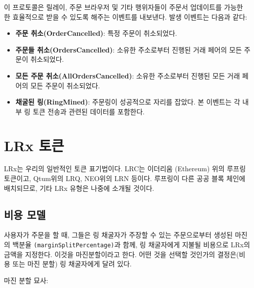 \documentclass{article}
\makeatletter
\newenvironment{figurehere}
{\def\@captype{figure}}
{}
\makeatother
\begin{document}
\begin{multicols}{2}
이 프로토콜은 릴레이, 주문 브라우저 및 기타 행위자들이 주문서 업데이트를 가능한 한 효율적으로 받을 수 있도록 해주는 이벤트를 내보낸다. 발생 이벤트는 다음과 같다:

\begin{itemize}
	\item \textbf{주문 취소(OrderCancelled)}: 특정 주문이 취소되었다.
	\item \textbf{주문들 취소(OrdersCancelled)}: 소유한 주소로부터 진행된 거래 페어의 모든 주문이 취소되었다.
	\item \textbf{모든 주문 취소(AllOrdersCancelled)}: 소유한 주소로부터 진행된 모든 거래 페어의 모든 주문이 취소되었다.
	\item \textbf{채굴된 링(RingMined)}: 주문링이 성공적으로 자리를 잡았다. 본 이벤트는 각 내부 링 토큰 전송과 관련된 데이터를 포함한다.
\end{itemize}



\section{LRx 토큰\label{sec:token}}

LRx는 우리의 일반적인 토큰 표기법이다. LRC는 이더리움 (Ethereum) 위의 루프링 토큰이고, Qtum위의 LRQ, NEO위의 LRN 등이다. 루프링이 다른 공공 블록 체인에 배치되므로, 기타 LRx 유형은 나중에 소개될 것이다.

\subsection{비용 모델\label{sec:fee_model}}
사용자가 주문을 할 때, 그들은 링 채굴자가 주장할 수 있는 주문으로부터 생성된 마진의 백분율 \verb|(marginSplitPercentage)|과 함께, 링 채굴자에게 지불될 비용으로 LRx의 금액을 지정한다. 이것을 마진분할이라고 한다. 어떤 것을 선택할 것인가의 결정은(비용 또는 마진 분할) 링 채굴자에게 달려 있다. 

마진 분할 묘사:

\begin{center}
	\begin{figurehere}
		\centering
\end{figurehere}
\end{center}
\end{multicols}
\end{document}
